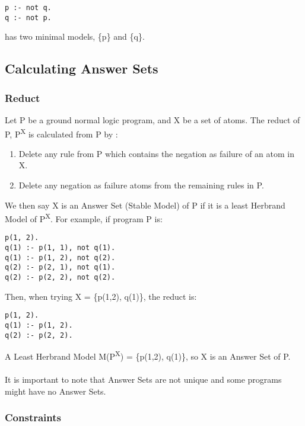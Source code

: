 \begin{lstlisting}
p :- not q.
q :- not p.
\end{lstlisting}

has two minimal models, \{p\} and \{q\}.

\subsection{Calculating Answer Sets}

\subsubsection{Reduct}

Let P be a ground normal logic program, and X be a set of atoms. The reduct of P, P\textsuperscript{X} is calculated from P by :

\begin{enumerate}
\item Delete any rule from P which contains the negation as failure of an atom in X.
\item Delete any negation as failure atoms from the remaining rules in P.
\end{enumerate}

We then say X is an Answer Set (Stable Model) of P if it is a least Herbrand Model of  P\textsuperscript{X}. For example, if program P is:

\begin{lstlisting}
p(1, 2).
q(1) :- p(1, 1), not q(1).
q(1) :- p(1, 2), not q(2).
q(2) :- p(2, 1), not q(1).
q(2) :- p(2, 2), not q(2).
\end{lstlisting}

Then, when trying X = \{p(1,2), q(1)\}, the reduct is:

\begin{lstlisting}
p(1, 2).
q(1) :- p(1, 2).
q(2) :- p(2, 2).
\end{lstlisting}

A Least Herbrand Model M(P\textsuperscript{X}) = \{p(1,2), q(1)\}, so X is an Answer Set of P. \\ \\

It is important to note that Answer Sets are not unique and some programs might have no Answer Sets.

\subsubsection{Constraints}

